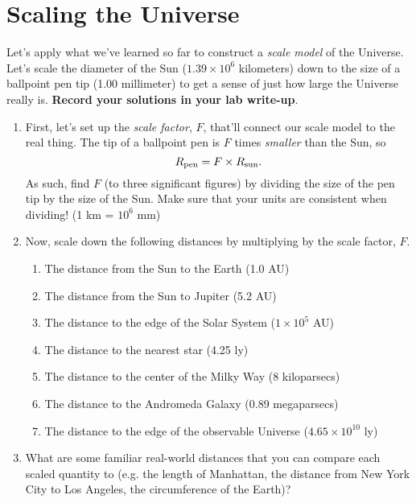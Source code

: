 \documentclass[11pt]{article}
\begin{document}
\section{Scaling the Universe}

Let's apply what we've learned so far to construct a \emph{scale model} of the Universe. Let's scale the diameter of the Sun ($1.39 \times 10^6$ kilometers) down to the size of a ballpoint pen tip (1.00 millimeter) to get a sense of just how large the Universe really is. \textbf{Record your solutions in your lab write-up}.

\begin{enumerate}
    \item First, let's set up the \emph{scale factor}, $F$, that'll connect our scale model to the real thing. The tip of a ballpoint pen is $F$ times \emph{smaller} than the Sun, so $$R_{\rm pen} = F \times R_{\rm sun}.$$ As such, find $F$ (to three significant figures) by dividing the size of the pen tip by the size of the Sun. Make sure that your units are consistent when dividing! (1 km = $10^6$ mm)
    
    \item Now, scale down the following distances by multiplying by the scale factor, $F$.
    \begin{enumerate}
        \item The distance from the Sun to the Earth (1.0 AU) 
        \item The distance from the Sun to Jupiter (5.2 AU)
        \item The distance to the edge of the Solar System ($1 \times 10^5$ AU)
        \item The distance to the nearest star (4.25 ly)
        \item The distance to the center of the Milky Way (8 kiloparsecs)
        \item The distance to the Andromeda Galaxy (0.89 megaparsecs)
        \item The distance to the edge of the observable Universe ($4.65 \times 10^{10}$ ly)
    \end{enumerate}
    
    \item What are some familiar real-world distances that you can compare each scaled quantity to (e.g. the length of Manhattan, the distance from New York City to Los Angeles, the circumference of the Earth)?
\end{enumerate}

\bigskip
\end{document}
